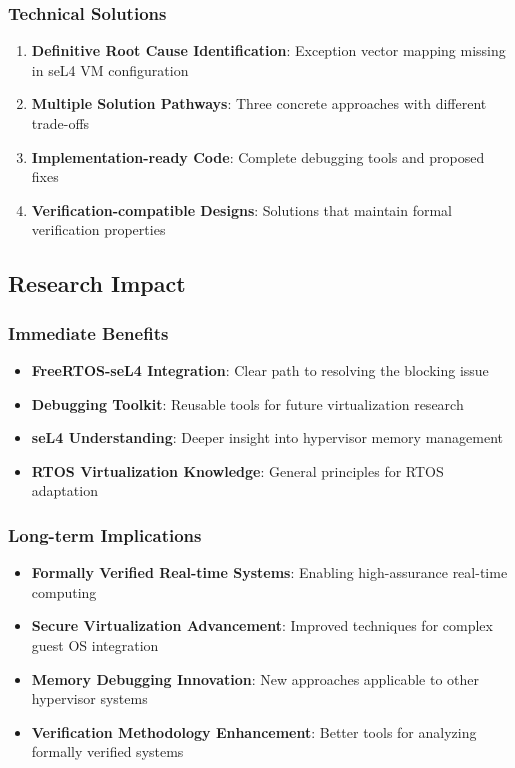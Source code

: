 \documentclass[11pt,a4paper]{article}
\begin{document}
\subsubsection{Technical Solutions}

\begin{enumerate}
    \item \textbf{Definitive Root Cause Identification}: Exception vector mapping missing in seL4 VM configuration
    \item \textbf{Multiple Solution Pathways}: Three concrete approaches with different trade-offs
    \item \textbf{Implementation-ready Code}: Complete debugging tools and proposed fixes
    \item \textbf{Verification-compatible Designs}: Solutions that maintain formal verification properties
\end{enumerate}

\subsection{Research Impact}

\subsubsection{Immediate Benefits}

\begin{itemize}
    \item \textbf{FreeRTOS-seL4 Integration}: Clear path to resolving the blocking issue
    \item \textbf{Debugging Toolkit}: Reusable tools for future virtualization research
    \item \textbf{seL4 Understanding}: Deeper insight into hypervisor memory management
    \item \textbf{RTOS Virtualization Knowledge}: General principles for RTOS adaptation
\end{itemize}

\subsubsection{Long-term Implications}

\begin{itemize}
    \item \textbf{Formally Verified Real-time Systems}: Enabling high-assurance real-time computing
    \item \textbf{Secure Virtualization Advancement}: Improved techniques for complex guest OS integration
    \item \textbf{Memory Debugging Innovation}: New approaches applicable to other hypervisor systems
    \item \textbf{Verification Methodology Enhancement}: Better tools for analyzing formally verified systems
\end{itemize}
\end{document}
